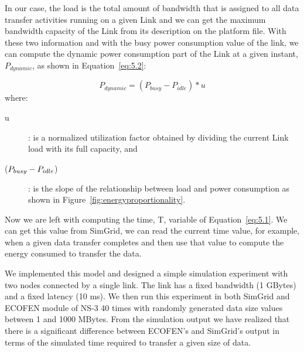 In our case, the load is the total amount of bandwidth that is assigned to all data transfer activities running on a given Link and we can get the maximum bandwidth capacity of the Link from its description on the platform file. With these two information and with the busy power consumption value of the link, we can compute the dynamic power consumption part of the Link at a given instant, \(P_{dynamic}\), as shown in Equation~\ref{eq:5.2}:

\begin{equation} \label{eq:5.2}
P_{dynamic} = (P_{busy} - P_{idle}) * u 
\end{equation} 
where:
\begin{description}
    \item [u]: is a normalized utilization factor obtained by dividing the current Link load with its full capacity, and 
    \item [(\($$P_{busy} - P_{idle}$$\))]: is the slope of the relationship between load and power consumption as shown in Figure~\ref{fig:energyproportionality}.
\end{description} 

Now we are left with computing the time, T, variable of Equation~\ref{eq:5.1}. We can get this value from SimGrid, we can read the current time value, for example, when a given data transfer completes and then use that value to compute the energy consumed to transfer the data.

We implemented this model and designed a simple simulation experiment with two nodes connected by a single link. The link has a fixed bandwidth (1 GBytes) and a fixed latency (10 ms). We then run this experiment in both SimGrid and ECOFEN module of NS-3 40 times with randomly generated data size values between 1 and 1000 MBytes. From the simulation output we have realized that there is a significant difference between ECOFEN's and SimGrid's output in terms of the simulated time required to transfer a given size of data. 

